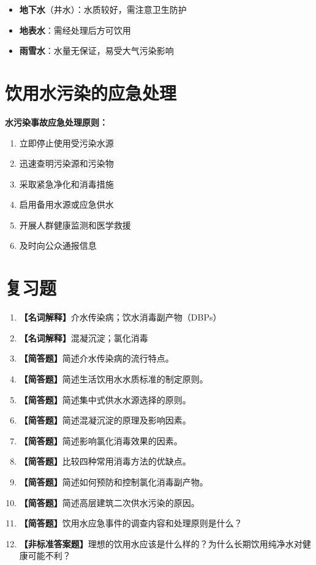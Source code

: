 \documentclass[10pt,a4paper,oneside]{ctexbook}
\begin{document}
\begin{itemize}[leftmargin=*]
    \item \textbf{地下水}（井水）：水质较好，需注意卫生防护
    \item \textbf{地表水}：需经处理后方可饮用
    \item \textbf{雨雪水}：水量无保证，易受大气污染影响
\end{itemize}

\section{饮用水污染的应急处理}

\textbf{水污染事故应急处理原则：}
\begin{enumerate}[leftmargin=*]
    \item 立即停止使用受污染水源
    \item 迅速查明污染源和污染物
    \item 采取紧急净化和消毒措施
    \item 启用备用水源或应急供水
    \item 开展人群健康监测和医学救援
    \item 及时向公众通报信息
\end{enumerate}

\section{复习题}

\begin{enumerate}[leftmargin=*, itemsep=8pt]
    \item \textbf{【名词解释】}介水传染病；饮水消毒副产物（DBPs）
    \item \textbf{【名词解释】}混凝沉淀；氯化消毒
    \item \textbf{【简答题】}简述介水传染病的流行特点。
    \item \textbf{【简答题】}简述生活饮用水水质标准的制定原则。
    \item \textbf{【简答题】}简述集中式供水水源选择的原则。
    \item \textbf{【简答题】}简述混凝沉淀的原理及影响因素。
    \item \textbf{【简答题】}简述影响氯化消毒效果的因素。
    \item \textbf{【简答题】}比较四种常用消毒方法的优缺点。
    \item \textbf{【简答题】}简述如何预防和控制氯化消毒副产物。
    \item \textbf{【简答题】}简述高层建筑二次供水污染的原因。
    \item \textbf{【简答题】}饮用水应急事件的调查内容和处理原则是什么？
    \item \textbf{【非标准答案题】}理想的饮用水应该是什么样的？为什么长期饮用纯净水对健康可能不利？
\end{enumerate}
\end{document}
